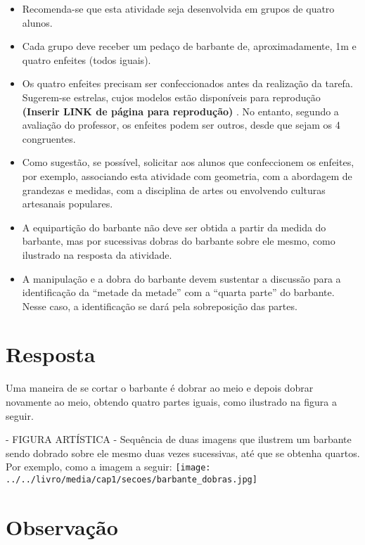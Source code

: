 \documentclass{book}
\begin{document}
\begin{itemize} %
    \item       Recomenda-se que esta atividade seja desenvolvida em grupos de quatro alunos.
    \item       Cada grupo deve receber um pedaço de barbante de, aproximadamente, 1m e quatro enfeites (todos iguais).
    \item       Os quatro enfeites precisam ser confeccionados antes da realização da tarefa. Sugerem-se estrelas, cujos modelos estão disponíveis para reprodução       {\bf (Inserir LINK de página para reprodução)}      . No entanto, segundo a avaliação do professor, os enfeites podem ser outros, desde que sejam os 4 congruentes.
    \item       Como sugestão, se possível, solicitar aos alunos que confeccionem os enfeites, por exemplo, associando esta atividade com geometria, com a abordagem de grandezas e medidas, com a disciplina de artes ou envolvendo culturas artesanais populares.
    \item       A equipartição do barbante não deve ser obtida a partir da medida do barbante, mas por sucessivas dobras do barbante sobre ele mesmo, como ilustrado na resposta da atividade.
    \item       A manipulação e a dobra do barbante devem sustentar a discussão para a identificação da       ``metade da metade''       com a       ``quarta parte''       do barbante. Nesse caso, a identificação se dará pela sobreposição das partes.
\end{itemize} %




\section{Resposta}   Uma maneira de se cortar o barbante é dobrar ao meio e depois dobrar novamente ao meio, obtendo quatro partes iguais, como ilustrado na figura a seguir.
  \begin{imagem*}[breakable]{}{}     - FIGURA ARTÍSTICA - Sequência de duas imagens que ilustrem um barbante sendo dobrado sobre ele mesmo duas vezes sucessivas, até que se obtenha quartos. Por exemplo, como a imagem a seguir:
        \texttt{[image: ../../livro/media/cap1/secoes/barbante\_dobras.jpg]}
  \end{imagem*}



\section{Observação}
\end{document}
